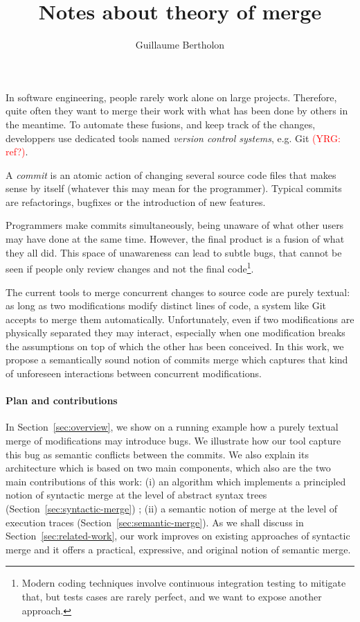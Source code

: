 \documentclass[a4paper,10pt]{article}
\title{Notes about theory of merge}
\author{Guillaume Bertholon}
\newcommand\yrg[1]{\textcolor{red}{(YRG: #1)}}
\begin{document}
\maketitle

In software engineering, people rarely work alone on large
projects. Therefore, quite often they want to merge their work with
what has been done by others in the meantime.
%
To automate these fusions, and keep track of the changes, developpers use
dedicated tools named \textit{version control systems}, e.g. Git \yrg{ref?}.

A \textit{commit} is an atomic action of changing several
source code files that makes sense by itself (whatever this may mean
for the programmer). Typical commits are refactorings, bugfixes or the
introduction of new features.

Programmers make commits simultaneously, being unaware of what other
users may have done at the same time. However, the final product is a
fusion of what they all did. This space of unawareness can lead to
subtle bugs, that cannot be seen if people only review changes and not
the final code\footnote{Modern coding techniques involve continuous
  integration testing to mitigate that, but tests cases are rarely
  perfect, and we want to expose another approach.}.

The current tools to merge concurrent changes to source code are
purely textual: as long as two modifications modify distinct lines of
code, a system like Git accepts to merge them
automatically. Unfortunately, even if two modifications are physically
separated they may interact, especially when one modification breaks
the assumptions on top of which the other has been conceived. In this
work, we propose a semantically sound notion of commits merge which
captures that kind of unforeseen interactions between concurrent
modifications.

\paragraph{Plan and contributions}
In Section~\ref{sec:overview}, we show on a running example how a
purely textual merge of modifications may introduce bugs. We
illustrate how our tool capture this bug as semantic conflicts between
the commits. We also explain its architecture which is based on two
main components, which also are the two main contributions of this
work: (i) an algorithm which implements a principled notion of
syntactic merge at the level of abstract syntax trees
(Section~\ref{sec:syntactic-merge}) ; (ii) a semantic notion of merge
at the level of execution traces (Section~\ref{sec:semantic-merge}).
As we shall discuss in Section~\ref{sec:related-work}, our work
improves on existing approaches of syntactic merge and it offers a
practical, expressive, and original notion of semantic merge.
\end{document}
